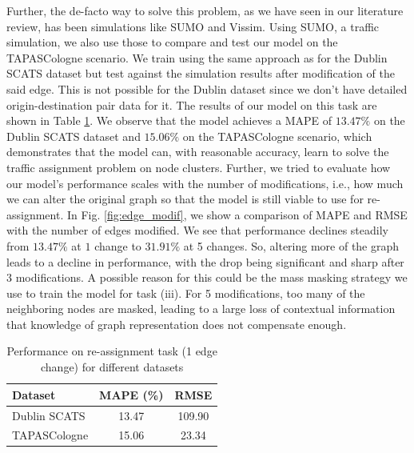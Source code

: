 Further, the de-facto way to solve this problem, as we have seen in our literature review, has been simulations like SUMO\cite{sumo} and Vissim\cite{vissim}. Using SUMO, a traffic simulation, we also use those to compare and test our model on the TAPASCologne scenario. We train using the same approach as for the Dublin SCATS dataset but test against the simulation results after modification of the said edge.  This is not possible for the Dublin dataset since we don't have detailed origin-destination pair data for it. The results of our model on this task are shown in Table \ref{reassign_table}. We observe that the model achieves a MAPE of $13.47\%$ on the Dublin SCATS dataset and $15.06\%$ on the TAPASCologne scenario, which demonstrates that the model can, with reasonable accuracy, learn to solve the traffic assignment problem on node clusters. Further, we tried to evaluate how our model's performance scales with the number of modifications, i.e., how much we can alter the original graph so that the model is still viable to use for re-assignment. In Fig. \ref{fig:edge_modif}, we show a comparison of MAPE and RMSE with the number of edges modified. We see that performance declines steadily from $13.47\%$ at $1$ change to $31.91\%$ at 5 changes. So, altering more of the graph leads to a decline in performance, with the drop being significant and sharp after $3$ modifications. A possible reason for this could be the mass masking strategy we use to train the model for task (iii). For 5 modifications, too many of the neighboring nodes are masked, leading to a large loss of contextual information that knowledge of graph representation does not compensate enough. 

\begin{table}[]
\centering
\caption{Performance on re-assignment task (1 edge change) for different datasets}
\label{reassign_table}
\begin{tabular}{lcc}
\toprule
Dataset & MAPE (\%) & RMSE \\
\midrule
Dublin SCATS & 13.47 & 109.90 \\
TAPASCologne & 15.06 & 23.34 \\
\bottomrule
\end{tabular}
\end{table}